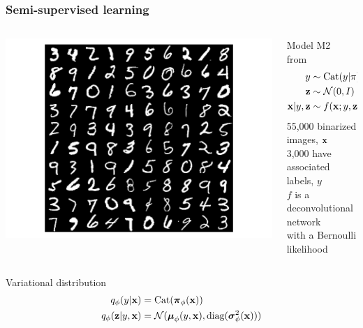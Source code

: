 \documentclass[10pt]{beamer}
\begin{document}
\begin{frame}
  \frametitle{Semi-supervised learning}

  \begin{columns}
    \begin{column}{0.4\textwidth}
      \includegraphics[width=\textwidth]{img/mnist-digits-small}
    \end{column}
    \begin{column}{0.6\textwidth}
      \begin{center}
        Model M2 from~\cite{kingma_semi-supervised_2014}
        \begin{align*}
          y &\sim \textnormal{Cat}(y|\pi) \\
          \boldsymbol{\mathbf{z}} &\sim \mathcal{N}(0, I) \\
          \boldsymbol{\mathbf{x}}|y, \boldsymbol{\mathbf{z}} &\sim f(\boldsymbol{\mathbf{x}}; y, \boldsymbol{\mathbf{z}}, \theta)
        \end{align*}
        55,000 binarized images, $\boldsymbol{\mathbf{x}}$ \\
        3,000 have associated labels, $y$ \\
        $f$ is a deconvolutional network \\
        with a Bernoulli likelihood
      \end{center}
    \end{column}
  \end{columns}
  \begin{block}{Variational distribution}
    \begin{align*}
      q_\phi(y|\boldsymbol{\mathbf{x}}) &= \textnormal{Cat}(\boldsymbol{\mathbf{\pi}}_\phi(\boldsymbol{\mathbf{x}})) \\
      q_\phi(\boldsymbol{\mathbf{z}}|y, \boldsymbol{\mathbf{x}}) &= \mathcal{N}(\boldsymbol{\mathbf{\mu}}_\phi(y, \boldsymbol{\mathbf{x}}), \textnormal{diag}(\boldsymbol{\mathbf{\sigma}}^2_\phi(\boldsymbol{\mathbf{x}})))
    \end{align*}
  \end{block}
\end{frame}
\end{document}
